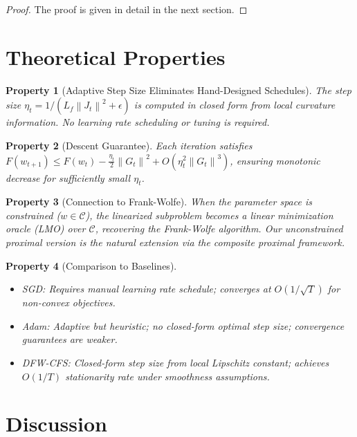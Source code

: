 \documentclass{article}
\newcommand{\norm}[1]{\left\| #1 \right\|}
\newtheorem{property}{Property}
\begin{document}
\begin{proof}
The proof is given in detail in the next section.
\end{proof}

\section*{Theoretical Properties}

\begin{property}[Adaptive Step Size Eliminates Hand-Designed Schedules]
The step size $\eta_t = 1/(L_f \norm{J_t}^2 + \epsilon)$ is computed in closed form from local curvature information. No learning rate scheduling or tuning is required.
\end{property}

\begin{property}[Descent Guarantee]
Each iteration satisfies $F(w_{t+1}) \le F(w_t) - \frac{\eta_t}{2} \norm{G_t}^2 + O(\eta_t^2 \norm{G_t}^3)$, ensuring monotonic decrease for sufficiently small $\eta_t$.
\end{property}

\begin{property}[Connection to Frank-Wolfe]
When the parameter space is constrained ($w \in \mathcal{C}$), the linearized subproblem becomes a linear minimization oracle (LMO) over $\mathcal{C}$, recovering the Frank-Wolfe algorithm. Our unconstrained proximal version is the natural extension via the composite proximal framework.
\end{property}

\begin{property}[Comparison to Baselines]
\begin{itemize}
    \item \textit{SGD}: Requires manual learning rate schedule; converges at $O(1/\sqrt{T})$ for non-convex objectives.
    \item \textit{Adam}: Adaptive but heuristic; no closed-form optimal step size; convergence guarantees are weaker.
    \item \textit{DFW-CFS}: Closed-form step size from local Lipschitz constant; achieves $O(1/T)$ stationarity rate under smoothness assumptions.
\end{itemize}
\end{property}

\section*{Discussion}
\end{document}
